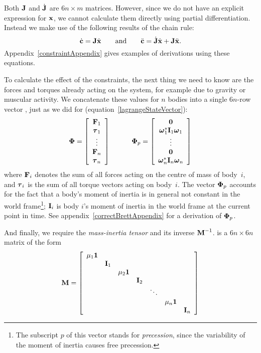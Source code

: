 Both $\m{J}$ and $\dot{\m{J}}$ are $6n\times m$ matrices. However, since we do not
have an explicit expression for $\ve{x}$, we cannot calculate them directly using
partial differentiation. Instead we make use of the following results of the chain rule:
\begin{equation}
\label{cDotAndCDDot}
\dot{\ve{c}} = \m{J}\dot{\ve{x}} \quad\quad\mathrm{and}\quad\quad
\ddot{\ve{c}} = \dot{\m{J}}\dot{\ve{x}} + \m{J}\ddot{\ve{x}}.
\end{equation}
Appendix~\ref{constraintAppendix} gives examples of derivations using these equations.

To calculate the effect of the constraints, the next thing we need to know are the forces
and torques already acting on the system, for example due to gravity or muscular activity. We
concatenate these values for $n$ bodies into a single $6n$-row vector \ve{\Phi}, just as we did
for  (equation~\ref{lagrangeStateVector}):
\begin{equation} \label{PhiVector}
\ve{\Phi} = \left[\begin{array}{c}
    \ve{F}_1 \\ \ve{\tau}_1 \\ \vdots \\ \ve{F}_n \\ \ve{\tau}_n
    \end{array}\right]
    \quad\quad\quad
\ve{\Phi}_p = \left[\begin{array}{c}
    \ve{0} \\ \dual{\ve{\omega}_1}\m{I}_1\ve{\omega}_1 \\ \vdots \\
    \ve{0} \\ \dual{\ve{\omega}_n}\m{I}_n\ve{\omega}_n
    \end{array}\right]
\end{equation}
where $\ve{F}_i$ denotes the sum of all forces acting on the centre of mass of body~$i$, and
$\ve{\tau}_i$ is the sum of all torque vectors acting on body~$i$. The vector $\ve{\Phi}_p$
accounts for the fact that a body's moment of inertia is in general not constant in the world
frame\footnote{The subscript $p$ of this vector stands for \emph{precession}, since the
variability of the moment of inertia causes free precession.}; $\m{I}_i$ is body $i$'s moment
of inertia in the world frame at the current point in time.
See appendix~\ref{correctBrettAppendix} for a derivation of $\ve{\Phi}_p$.

And finally, we require the \emph{mass-inertia tensor}  and its inverse
$\m{M}^{-1}$.  is a $6n\times6n$ matrix of the form
\begin{equation}
\label{massInertiaTensor}
\m{M} = \left[ \begin{array}{ccccccc}
    \mu_1\m{1} \\ & \m{I}_1 \\ &&
    \mu_2\m{1} \\ &&& \m{I}_2 \\ &&&& \ddots \\ &&&&&
    \mu_n\m{1} \\ &&&&&& \m{I}_n
    \end{array}\right]
\end{equation}

